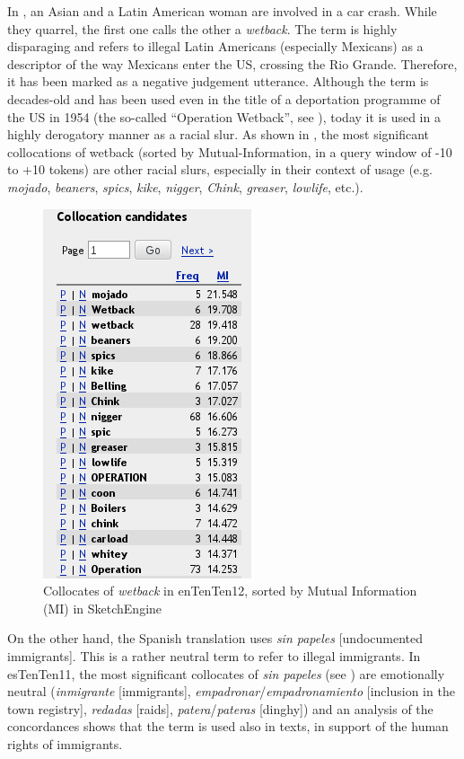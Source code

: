 \documentclass[output=paper]{LSP/langsci}
\begin{document}
In , an Asian and a Latin American woman are involved in a car crash. While they quarrel, the first one calls the other a \textit{wetback}. The term is highly disparaging and refers to illegal Latin Americans (especially Mexicans) as a descriptor of the way Mexicans enter the US, crossing the Rio Grande. Therefore, it has been marked as a negative judgement utterance. Although the term is decades-old and has been used even in the title of a deportation programme of the US in 1954 (the so-called “Operation Wetback”, see \citealt{Hernandez2006}), today it is used in a highly derogatory manner as a racial slur. As shown in , the most significant collocations of wetback (sorted by Mutual-Information, in a query window of {-10 to +10} tokens) are other racial slurs, especially in their context of usage (e.g. \textit{mojado}, \textit{beaners}, \textit{spics}, \textit{kike}, \textit{nigger}, \textit{Chink}, \textit{greaser}, \textit{lowlife}, etc.).

\begin{figure}
\includegraphics[width=.3\textwidth]{./figures/4-5.png}
\caption{Collocates of \emph{wetback} in enTenTen12, sorted by Mutual Information (MI) in SketchEngine} \label{fig:2:6}
\end{figure}

On the other hand, the Spanish translation uses \textit{sin papeles} [undocumented immigrants]. This is a rather neutral term to refer to illegal immigrants. In esTenTen11, the most significant collocates of \textit{sin papeles} (see ) are emotionally neutral (\textit{inmigrante} [immigrants], \textit{empadronar}/\textit{empadronamiento} [inclusion in the town registry], \textit{redadas} [raids], \textit{patera}/\textit{pateras} [dinghy]) and an analysis of the concordances shows that the term is used also in texts, in support of the human rights of immigrants.
\end{document}
